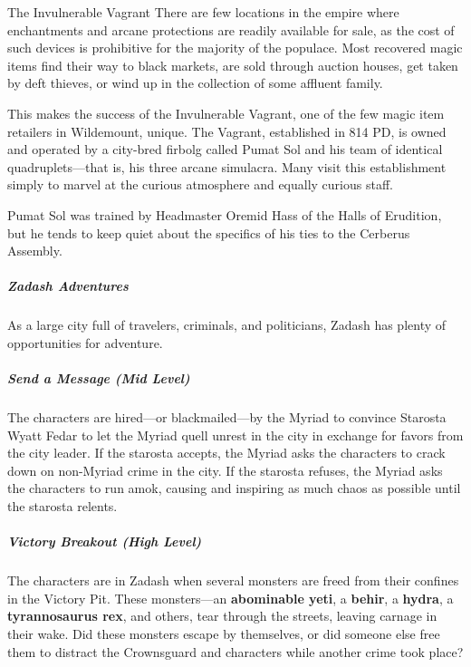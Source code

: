 \documentclass[10pt,a4paper,twoside,bg=print,twocolumn,openany,nodeprecatedcode]{dndbook}
\begin{document}
\begin{DndSidebar}[float=!b]{The Invulnerable Vagrant}
There are few locations in the empire where enchantments and arcane protections are readily available for sale, as the cost of such devices is prohibitive for the majority of the populace. Most recovered magic items find their way to black markets, are sold through auction houses, get taken by deft thieves, or wind up in the collection of some affluent family.



This makes the success of the Invulnerable Vagrant, one of the few magic item retailers in Wildemount, unique. The Vagrant, established in 814 PD, is owned and operated by a city-bred firbolg called Pumat Sol and his team of identical quadruplets—that is, his three arcane simulacra. Many visit this establishment simply to marvel at the curious atmosphere and equally curious staff.



Pumat Sol was trained by Headmaster Oremid Hass of the Halls of Erudition, but he tends to keep quiet about the specifics of his ties to the Cerberus Assembly.



\end{DndSidebar}

\subparagraph{Zadash Adventures}
As a large city full of travelers, criminals, and politicians, Zadash has plenty of opportunities for adventure.

\subparagraph{Send a Message (Mid Level)}
The characters are hired—or blackmailed—by the Myriad to convince Starosta Wyatt Fedar to let the Myriad quell unrest in the city in exchange for favors from the city leader. If the starosta accepts, the Myriad asks the characters to crack down on non-Myriad crime in the city. If the starosta refuses, the Myriad asks the characters to run amok, causing and inspiring as much chaos as possible until the starosta relents.

\subparagraph{Victory Breakout (High Level)}
The characters are in Zadash when several monsters are freed from their confines in the Victory Pit. These monsters—an \textbf{abominable yeti}, a \textbf{behir}, a \textbf{hydra}, a \textbf{tyrannosaurus rex}, and others, tear through the streets, leaving carnage in their wake. Did these monsters escape by themselves, or did someone else free them to distract the Crownsguard and characters while another crime took place?
\end{document}
